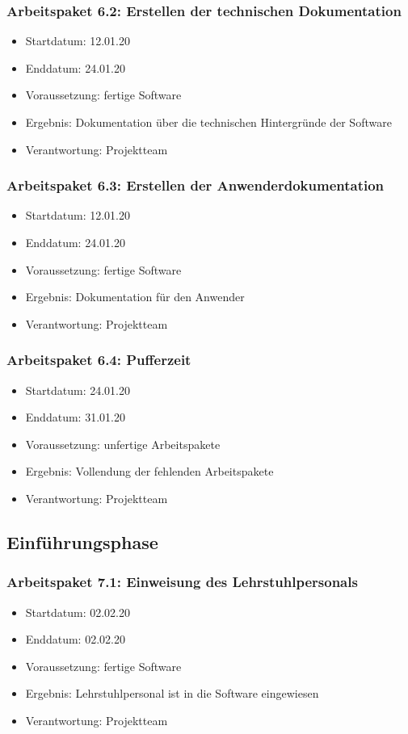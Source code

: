 \subsubsection*{Arbeitspaket 6.2: Erstellen der technischen Dokumentation}
\begin{itemize}
\item Startdatum: 12.01.20
\item Enddatum: 24.01.20
\item Voraussetzung: fertige Software
\item Ergebnis: Dokumentation über die technischen Hintergründe der Software
\item Verantwortung: Projektteam
\end{itemize}
\subsubsection*{Arbeitspaket 6.3: Erstellen der Anwenderdokumentation}
\begin{itemize}
\item Startdatum: 12.01.20
\item Enddatum: 24.01.20
\item Voraussetzung: fertige Software
\item Ergebnis: Dokumentation für den Anwender
\item Verantwortung: Projektteam
\end{itemize}
\subsubsection*{Arbeitspaket 6.4: Pufferzeit}
\begin{itemize}
\item Startdatum: 24.01.20
\item Enddatum: 31.01.20
\item Voraussetzung: unfertige Arbeitspakete
\item Ergebnis: Vollendung der fehlenden Arbeitspakete 
\item Verantwortung: Projektteam
\end{itemize}
\subsection*{Einführungsphase}
\subsubsection*{Arbeitspaket 7.1: Einweisung des Lehrstuhlpersonals}
\begin{itemize}
\item Startdatum: 02.02.20
\item Enddatum: 02.02.20
\item Voraussetzung: fertige Software
\item Ergebnis: Lehrstuhlpersonal ist in die Software eingewiesen
\item Verantwortung: Projektteam
\end{itemize}
